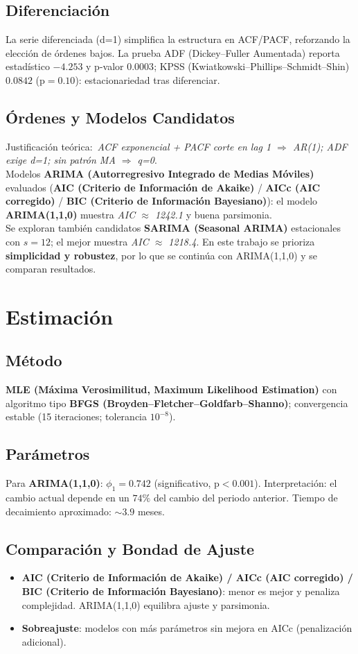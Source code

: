 \documentclass[11pt,a4paper]{article}
\begin{document}
\subsection{Diferenciación}
La serie diferenciada (d=1) simplifica la estructura en ACF/PACF, reforzando la elección de órdenes bajos. La prueba ADF (Dickey--Fuller Aumentada) reporta estadístico $-4.253$ y p-valor $0.0003$; KPSS (Kwiatkowski--Phillips--Schmidt--Shin) $0.0842$ (p$=0.10$): estacionariedad tras diferenciar.

\subsection{Órdenes y Modelos Candidatos}
Justificación teórica:\ \textit{ACF exponencial + PACF corte en lag 1 $\Rightarrow$ AR(1); ADF exige d=1; sin patrón MA $\Rightarrow$ q=0}.\\
Modelos \textbf{ARIMA (Autorregresivo Integrado de Medias Móviles)} evaluados (\textbf{AIC (Criterio de Información de Akaike)} / \textbf{AICc (AIC corregido)} / \textbf{BIC (Criterio de Información Bayesiano)}): el modelo \textbf{ARIMA(1,1,0)} muestra \textit{AIC $\approx$ 1242.1} y buena parsimonia.\\
Se exploran también candidatos \textbf{SARIMA (Seasonal ARIMA)} estacionales con $s=12$; el mejor muestra \textit{AIC $\approx$ 1218.4}. En este trabajo se prioriza \textbf{simplicidad y robustez}, por lo que se continúa con ARIMA(1,1,0) y se comparan resultados.

\section{Estimación}
\subsection{Método}
\textbf{MLE (Máxima Verosimilitud, Maximum Likelihood Estimation)} con algoritmo tipo \textbf{BFGS (Broyden--Fletcher--Goldfarb--Shanno)}; convergencia estable (15 iteraciones; tolerancia $10^{-8}$).

\subsection{Parámetros}
Para \textbf{ARIMA(1,1,0)}: $\phi_1=0.742$ (significativo, p$<0.001$). Interpretación: el cambio actual depende en un $74\%$ del cambio del periodo anterior. Tiempo de decaimiento aproximado: $\sim3.9$ meses.

\subsection{Comparación y Bondad de Ajuste}
\begin{itemize}
  \item \textbf{AIC (Criterio de Información de Akaike) / AICc (AIC corregido) / BIC (Criterio de Información Bayesiano)}: menor es mejor y penaliza complejidad. ARIMA(1,1,0) equilibra ajuste y parsimonia.
  \item \textbf{Sobreajuste}: modelos con más parámetros sin mejora en AICc (penalización adicional).
\end{itemize}
\end{document}
